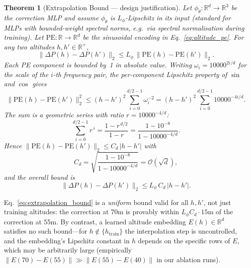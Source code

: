 \documentclass[9.5pt,twocolumn,a4paper]{IEEEtran}
\newtheorem{theorem}{Theorem}
\begin{document}
\begin{theorem}[Extrapolation Bound --- design justification]
\label{thm:extrapolation}
Let $\phi_\theta : \mathbb{R}^d \to \mathbb{R}^3$ be the correction MLP and assume $\phi_\theta$ is $L_\phi$-Lipschitz in its input (standard for MLPs with bounded-weight spectral norms, e.g.\ via spectral normalisation during training). Let $\text{PE} : \mathbb{R} \to \mathbb{R}^d$ be the sinusoidal encoding in Eq.~\ref{eq:altitude_pe}. For any two altitudes $h, h' \in \mathbb{R}^+$,
\begin{equation}
    \|\Delta P(h) - \Delta P(h')\|_2
    \le L_\phi \, \|\text{PE}(h) - \text{PE}(h')\|_2.
    \label{eq:lip_chain}
\end{equation}
Each PE component is bounded by~1 in absolute value. Writing $\omega_i = 10000^{2i/d}$ for the scale of the $i$-th frequency pair, the per-component Lipschitz property of $\sin$ and $\cos$ gives
\begin{equation}
    \|\text{PE}(h) - \text{PE}(h')\|_2^2
    \le (h - h')^2 \sum_{i=0}^{d/2-1} \omega_i^{-2}
    = (h - h')^2 \sum_{i=0}^{d/2-1} 10000^{-4i/d}.
    \label{eq:pe_diff_sq}
\end{equation}
The sum is a geometric series with ratio $r = 10000^{-4/d}$:
\begin{equation}
    \sum_{i=0}^{d/2-1} r^{\,i} = \frac{1 - r^{\,d/2}}{1 - r}
    = \frac{1 - 10^{-8}}{1 - 10000^{-4/d}}.
    \label{eq:geometric_sum}
\end{equation}
Hence $\|\text{PE}(h) - \text{PE}(h')\|_2 \le C_d \,|h - h'|$ with
\begin{equation}
    C_d = \sqrt{ \frac{1 - 10^{-8}}{1 - 10000^{-4/d}} }
    = \mathcal{O}(\sqrt{d}),
    \label{eq:C_d}
\end{equation}
and the overall bound is
\begin{equation}
    \|\Delta P(h) - \Delta P(h')\|_2 \le L_\phi \, C_d \,|h - h'|.
    \label{eq:extrapolation_bound}
\end{equation}
\end{theorem}

Eq.~\ref{eq:extrapolation_bound} is a \emph{uniform} bound valid for all $h, h'$, not just training altitudes: the correction at 70m is provably within $L_\phi C_d \cdot 15\text{m}$ of the correction at 55m. By contrast, a learned altitude embedding $E(h) \in \mathbb{R}^d$ satisfies no such bound---for $h \notin \{h_{\text{train}}\}$ the interpolation step is uncontrolled, and the embedding's Lipschitz constant in $h$ depends on the specific rows of $E$, which may be arbitrarily large (empirically $\|E(70)-E(55)\| \gg \|E(55)-E(40)\|$ in our ablation runs).
\end{document}
